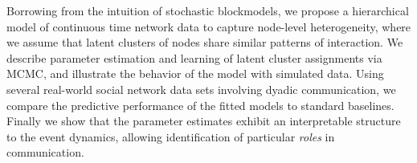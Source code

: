 

\begin{figure}

\caption{}
\label{fig:example}
\end{figure}

Borrowing from the intuition of stochastic blockmodels, we propose a hierarchical model of continuous time network data to capture node-level heterogeneity, where we assume that latent clusters of nodes share similar patterns of interaction.
We describe parameter estimation and learning of  latent cluster assignments via MCMC, and illustrate the behavior of the model  with simulated data.
Using several real-world social network data sets involving dyadic communication, we compare the predictive performance of the fitted models to standard baselines.
Finally we show that the parameter estimates exhibit an interpretable structure to the event dynamics, allowing identification of particular \emph{roles} in communication.
